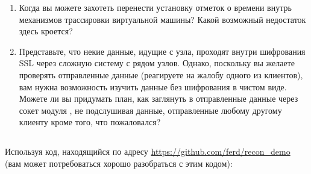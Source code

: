 \begin{enumerate}
	\item Когда вы можете захотеть перенести установку отметок о времени внутрь механизмов трассировки виртуальной машины? Какой возможный недостаток здесь кроется?
	\item Представьте, что некие данные, идущие с узла, проходят внутри шифрования SSL через сложную систему с рядом узлов. Однако, поскольку вы желаете проверять отправленные данные (реагируете на жалобу одного из клиентов), вам нужна возможность изучить данные без шифрования в чистом виде. Можете ли вы придумать план, как заглянуть в отправленные данные через сокет модуля , не подслушивая данные, отправленные любому другому клиенту кроме того, что пожаловался?
\end{enumerate}

\subsection*{\HandsOnTitle{}}

Используя код, находящийся по адресу \href{https://github.com/ferd/recon\_demo}{https://github.com/ferd/recon\_demo} (вам может потребоваться хорошо разобраться с этим кодом):


